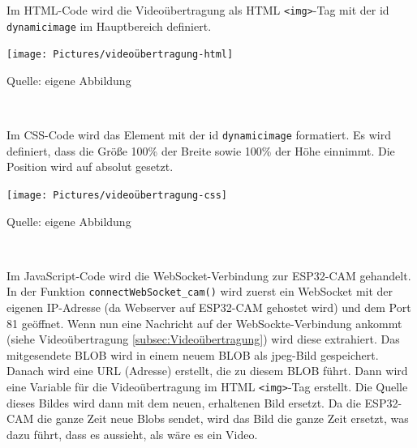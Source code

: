 \documentclass[ngerman,12pt,a4paper]{article}
\begin{document}
			
			\noindent
			Im HTML-Code wird die Videoübertragung als HTML \texttt{<img>}-Tag mit der id \texttt{dynamicimage} im Hauptbereich definiert.
			\begin{center}
				\begin{minipage}[t]{0.75\textwidth}
					\texttt{[image: Pictures/videoübertragung-html]}
					\label{fig:videoübertragung-html}
					\vspace{-10pt}
					\begin{center}
						\par\small Quelle: eigene Abbildung 
					\end{center}
				\end{minipage} \\[0.70cm]
			\end{center}
			Im CSS-Code wird das Element mit der id \texttt{dynamicimage} formatiert. Es wird definiert, dass die Größe 100\% der Breite sowie 100\% der Höhe einnimmt. Die Position wird auf absolut gesetzt. 
			\noindent
			\begin{center}
				\begin{minipage}[t]{0.43\textwidth}
					\texttt{[image: Pictures/videoübertragung-css]}
					\label{fig:videoübertragung-css}
					\vspace{-10pt}
					\begin{center}
						\par\small Quelle: eigene Abbildung 
					\end{center}
				\end{minipage} \\[0.2cm]
			\end{center}
			Im JavaScript-Code wird die WebSocket-Verbindung zur ESP32-CAM gehandelt. In der Funktion \texttt{connectWebSocket\_cam()} wird zuerst ein WebSocket mit der eigenen IP-Adresse (da Webserver auf ESP32-CAM gehostet wird) und dem Port 81 geöffnet. Wenn nun eine Nachricht auf der WebSockte-Verbindung ankommt (siehe Videoübertragung \ref{subsec:Videoübertragung}) wird diese extrahiert. Das mitgesendete BLOB wird in einem neuem BLOB als jpeg-Bild gespeichert. Danach wird eine URL (Adresse) erstellt, die zu diesem BLOB führt. Dann wird eine Variable für die Videoübertragung im HTML \texttt{<img>}-Tag erstellt. Die Quelle dieses Bildes wird dann mit dem neuen, erhaltenen Bild ersetzt. Da die ESP32-CAM die ganze Zeit neue Blobs sendet, wird das Bild die ganze Zeit ersetzt, was dazu führt, dass es aussieht, als wäre es ein Video. \\[0.1cm]
\end{document}
